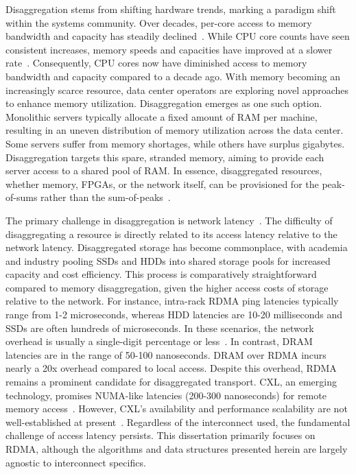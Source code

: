 \documentclass[12pt]{ucsddissertation}
\begin{document}
Disaggregation stems from shifting hardware trends, marking a paradigm shift within the systems
community. Over decades, per-core access to memory bandwidth and capacity has steadily declined~\cite{blade-server}. While CPU core counts have
seen consistent increases, memory speeds and capacities have improved at a slower
rate~\cite{micron-memorywall}. Consequently, CPU cores now have diminished access to memory
bandwidth and capacity compared to a decade ago. With memory becoming an increasingly scarce
resource, data center operators are exploring novel approaches to enhance memory utilization.
Disaggregation emerges as one such option.  Monolithic servers typically allocate a fixed amount of
RAM per machine, resulting in an uneven distribution of memory utilization across the data center.
Some servers suffer from memory shortages, while others have surplus gigabytes. Disaggregation
targets this spare, stranded memory, aiming to provide each server access to a shared pool of RAM.
In essence, disaggregated resources, whether memory, FPGAs, or the network itself, can be
provisioned for the peak-of-sums rather than the sum-of-peaks~\cite{clio,supernic,dsnf}.


The primary challenge in disaggregation is network latency~\cite{requirements}. The difficulty of
disaggregating a resource is directly related to its access latency relative to the network latency.
Disaggregated storage has become commonplace, with academia and industry pooling SSDs and HDDs into
shared storage pools for increased capacity and cost efficiency. This process is comparatively
straightforward compared to memory disaggregation, given the higher access costs of storage relative
to the network.
For instance, intra-rack RDMA ping latencies typically range from 1-2 microseconds, whereas HDD
latencies are 10-20 milliseconds and SSDs are often hundreds of microseconds. In these scenarios,
the network overhead is usually a single-digit percentage or less~\cite{decible}. In contrast, DRAM
latencies are in the range of 50-100 nanoseconds. DRAM over RDMA incurs nearly a 20x overhead
compared to local access. Despite this overhead, RDMA remains a prominent candidate for
disaggregated transport.
CXL, an emerging technology, promises NUMA-like latencies (200-300 nanoseconds) for remote memory
access~\cite{cxl}. However, CXL's availability and performance scalability are not well-established
at present~\cite{direct-cxl,pond,cxl-demyst}. Regardless of the interconnect used, the fundamental
challenge of access latency persists. This dissertation primarily focuses on RDMA, although the
algorithms and data structures presented herein are largely agnostic to interconnect specifics.
\end{document}
